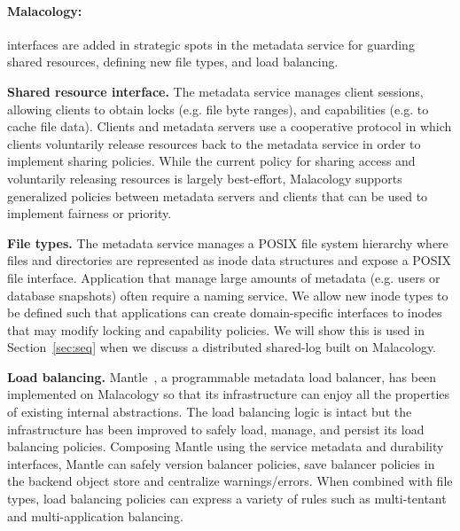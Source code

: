 \documentclass[preprint]{sigplanconf-eurosys}
\begin{document}

\paragraph*{Malacology:} interfaces are added in strategic spots in the
metadata service for guarding shared resources, defining new file types,
and load balancing.

{\bf Shared resource interface.}
The metadata service manages client sessions, allowing clients to obtain locks
(e.g. file byte ranges), and capabilities (e.g. to cache file data). Clients
and metadata servers use a cooperative protocol in which clients voluntarily
release resources back to the metadata service in order to implement sharing
policies. While the current policy for sharing access and voluntarily
releasing resources is largely best-effort, Malacology supports generalized
policies between metadata servers and clients that can be used to implement 
fairness or priority.

{\bf File types.} The metadata service manages a POSIX file system hierarchy
where files and directories are represented as inode data structures and
expose a POSIX file interface. Application that manage large amounts of
metadata (e.g. users or database snapshots) often require a naming service. We
allow new inode types to be defined such that applications can create
domain-specific interfaces to inodes that may modify locking and capability
policies. We will show this is used in Section~\ref{sec:seq} when we discuss a
distributed shared-log built on Malacology.

{\bf Load balancing.} Mantle~\cite{sevilla:sc15-mantle}, a programmable
metadata load balancer, has been implemented on Malacology so that its
infrastructure can enjoy all the properties of existing internal abstractions.
The load balancing logic is intact but the infrastructure has been improved to
safely load, manage, and persist its load balancing policies.  Composing Mantle
using the service metadata and durability interfaces, Mantle can safely
version balancer policies, save balancer policies in the backend object store
and centralize warnings/errors. When combined with file types, load balancing
policies can express a variety of rules such as multi-tentant and
multi-application balancing.
\end{document}
